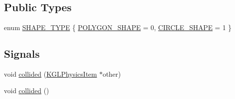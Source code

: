 \subsection*{Public Types}
\begin{CompactItemize}
\item 
enum \hyperlink{class_k_g_l_physics_item_b74dbd1e43d8bc18ec4fc6c16d3d4b7c}{SHAPE\_\-TYPE} \{ \hyperlink{class_k_g_l_physics_item_b74dbd1e43d8bc18ec4fc6c16d3d4b7c7f3449bf6512cac0a5dbf9aadc27b766}{POLYGON\_\-SHAPE} = 0, 
\hyperlink{class_k_g_l_physics_item_b74dbd1e43d8bc18ec4fc6c16d3d4b7c6b578fc66c478353e0e41ca78583a1e8}{CIRCLE\_\-SHAPE} = 1
 \}
\subsection*{Signals}
\begin{CompactItemize}
\item 
void \hyperlink{class_k_g_l_physics_item_839c757a057b738d58f315ea821a81a0}{collided} (\hyperlink{class_k_g_l_physics_item}{KGLPhysicsItem} $\ast$other)
\item 
void \hyperlink{class_k_g_l_physics_item_27a5f89aa48c78f0c3c18b20964eba24}{collided} ()
\end{CompactItemize}

\end{CompactItemize}
